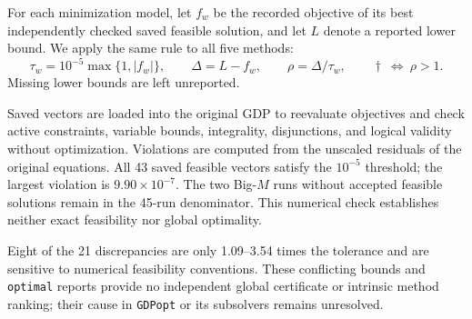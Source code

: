 For each minimization model, let \(f_w\) be the recorded objective of its best independently checked saved feasible solution, and let \(L\) denote a reported lower bound.
We apply the same rule to all five methods:
\begin{equation}
 \tau_w=10^{-5}\max\{1,|f_w|\},\qquad
 \Delta=L-f_w,\qquad \rho=\Delta/\tau_w,\qquad
 \dagger\ \Longleftrightarrow\ \rho>1.
\end{equation}
Missing lower bounds are left unreported.

Saved vectors are loaded into the original GDP to reevaluate objectives and check active constraints, variable bounds, integrality, disjunctions, and logical validity without optimization.
Violations are computed from the unscaled residuals of the original equations.
All 43 saved feasible vectors satisfy the \(10^{-5}\) threshold; the largest violation is \(9.90\times10^{-7}\).
The two Big-\(M\) runs without accepted feasible solutions remain in the 45-run denominator.
This numerical check establishes neither exact feasibility nor global optimality.

Eight of the 21 discrepancies are only 1.09--3.54 times the tolerance and are sensitive to numerical feasibility conventions.
These conflicting bounds and \nolinkurl{optimal} reports provide no independent global certificate or intrinsic method ranking; their cause in \texttt{GDPopt} or its subsolvers remains unresolved.

